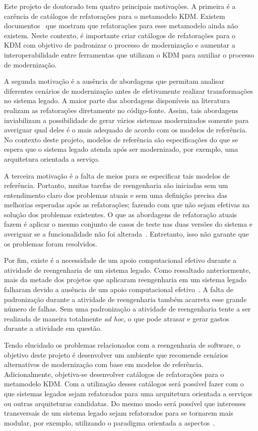 Este projeto de doutorado tem quatro principais motivações. A primeira é a carência de catálogos de refatorações para o metamodelo KDM. Existem documentos~\cite{OMGADM, ADMBook, ADMCHAPTERR} que mostram que refatorações para esse metamodelo ainda não existem. Neste contexto, é importante criar catálogos de refatorações para o KDM com objetivo de padronizar o processo de modernização e aumentar a interoperabilidade entre ferramentas que utilizam o KDM para auxiliar o processo de modernização.


A segunda motivação é a ausência de abordagens que permitam analisar diferentes cenários de modernização antes de efetivamente realizar transformações no sistema legado. A maior parte das abordagens disponíveis na literatura realizam as refatorações diretamente no código-fonte. Assim, tais abordagens inviabilizam a possibilidade de gerar vários sistemas modernizados somente para averiguar qual deles é o mais adequado de acordo com os modelos de referência. No contexto deste projeto, modelos de referência são especificações do que se espera que o sistema legado atenda após ser modernizado, por exemplo, uma arquitetura orientada a serviço.


A terceira motivação é a falta de meios para se especificar tais modelos de referência. Portanto, muitas tarefas de reengenharia são iniciadas sem um entendimento claro dos problemas atuais e sem uma definição precisa das melhorias esperadas após as refatorações; fazendo com que não sejam efetivas na solução dos problemas existentes. O que as abordagens de refatoração atuais fazem é aplicar o mesmo conjunto de casos de teste nas duas versões do sistema e averiguar se a funcionalidade não foi alterada~\cite{Demeyer1, Demeyer2, RefactoringJava}. Entretanto, isso não garante que os problemas foram resolvidos.


Por fim, existe é a necessidade de um apoio computacional efetivo durante a atividade de reengenharia de um sistema legado. Como ressaltado anteriormente, mais da metade dos projetos que aplicaram reengenharia em um sistema legado falharam devido a ausência de um apoio computacional efetivo~\cite{Sneed:2005}. A falta de padronização durante a atividade de reengenharia também acarreta esse grande número de falhas. Sem uma padronização a atividade de reengenharia tente a ser realizada de maneira totalmente \textit{ad hoc}, o que pode atrasar e gerar gastos durante a atividade em questão.


Tendo elucidado os problemas relacionados com a reengenharia de software, o objetivo deste projeto é desenvolver um ambiente que recomende cenários alternativos de modernização com base em modelos de referência. Adicionalmente, objetiva-se desenvolver catálogos de refatorações para o metamodelo KDM. Com a utilização desses catálogos será possível fazer com o que sistemas legados sejam refatorados para uma arquitetura orientada a serviços ou outras arquiteturas candidatas. Do mesmo modo será possível que interesses transversais de um sistema legado sejam refatorados para se tornarem mais modular, por exemplo, utilizando o paradigma orientada a aspectos~\cite{Kiczales}. 


